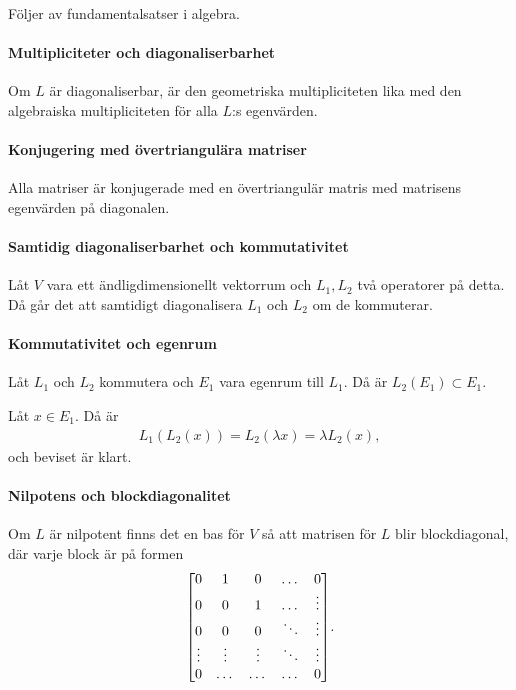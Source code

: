 \proof
Följer av fundamentalsatser i algebra.

\paragraph{Multipliciteter och diagonaliserbarhet}
Om $L$ är diagonaliserbar, är den geometriska multipliciteten lika med den algebraiska multipliciteten för alla $L$:s egenvärden.

\proof

\paragraph{Konjugering med övertriangulära matriser}
Alla matriser är konjugerade med en övertriangulär matris med matrisens egenvärden på diagonalen.

\proof

\paragraph{Samtidig diagonaliserbarhet och kommutativitet}
Låt $V$ vara ett ändligdimensionellt vektorrum och $L_{1}, L_{2}$ två operatorer på detta. Då går det att samtidigt diagonalisera $L_{1}$ och $L_{2}$ om de kommuterar.

\proof

\paragraph{Kommutativitet och egenrum}
Låt $L_{1}$ och $L_{2}$ kommutera och $E_{1}$ vara egenrum till $L_{1}$. Då är $L_{2}(E_{1})\subset E_{1}$.

\proof
Låt $x\in E_{1}$. Då är
\begin{align*}
	L_{1}(L_{2}(x)) = L_{2}(\lambda x) = \lambda L_{2}(x),
\end{align*}
och beviset är klart.

\paragraph{Nilpotens och blockdiagonalitet}
Om $L$ är nilpotent finns det en bas för $V$ så att matrisen för $L$ blir blockdiagonal, där varje block är på formen
\begin{align*}
	\mqty[
		0      & 1      & 0      & \dots  & 0 \\
		0      & 0      & 1      & \dots  & \vdots \\
		0      & 0      & 0      & \ddots & \vdots \\
		\vdots & \vdots & \vdots & \ddots & \vdots \\
		0      & \dots  & \dots  & \dots  & 0
	].
\end{align*}

